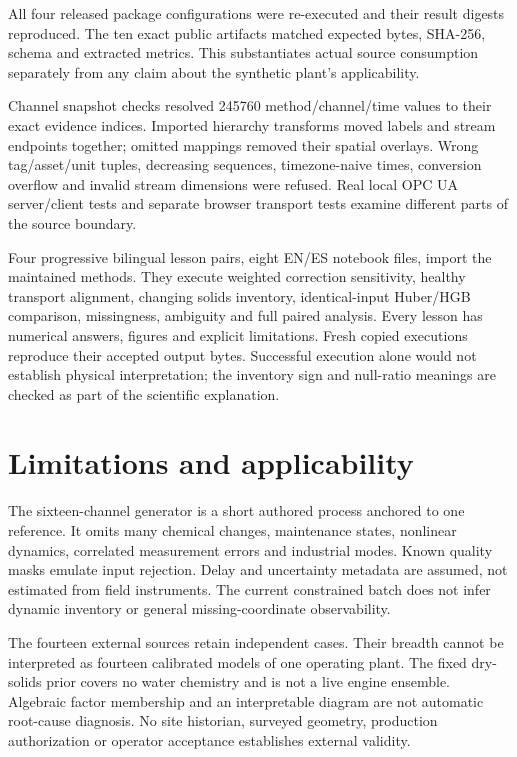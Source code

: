 \documentclass[11pt,a4paper]{article}
\begin{document}
All four released package configurations were re-executed and their result digests reproduced. The ten exact public artifacts matched expected bytes, SHA-256, schema and extracted metrics. This substantiates actual source consumption separately from any claim about the synthetic plant's applicability.

Channel snapshot checks resolved 245760 method/channel/time values to their exact evidence indices. Imported hierarchy transforms moved labels and stream endpoints together; omitted mappings removed their spatial overlays. Wrong tag/asset/unit tuples, decreasing sequences, timezone-naive times, conversion overflow and invalid stream dimensions were refused. Real local OPC UA server/client tests and separate browser transport tests examine different parts of the source boundary.

Four progressive bilingual lesson pairs, eight EN/ES notebook files, import the maintained methods. They execute weighted correction sensitivity, healthy transport alignment, changing solids inventory, identical-input Huber/HGB comparison, missingness, ambiguity and full paired analysis. Every lesson has numerical answers, figures and explicit limitations. Fresh copied executions reproduce their accepted output bytes. Successful execution alone would not establish physical interpretation; the inventory sign and null-ratio meanings are checked as part of the scientific explanation.

\section{Limitations and applicability}
The sixteen-channel generator is a short authored process anchored to one reference. It omits many chemical changes, maintenance states, nonlinear dynamics, correlated measurement errors and industrial modes. Known quality masks emulate input rejection. Delay and uncertainty metadata are assumed, not estimated from field instruments. The current constrained batch does not infer dynamic inventory or general missing-coordinate observability.

The fourteen external sources retain independent cases. Their breadth cannot be interpreted as fourteen calibrated models of one operating plant. The fixed dry-solids prior covers no water chemistry and is not a live engine ensemble. Algebraic factor membership and an interpretable diagram are not automatic root-cause diagnosis. No site historian, surveyed geometry, production authorization or operator acceptance establishes external validity.
\end{document}
